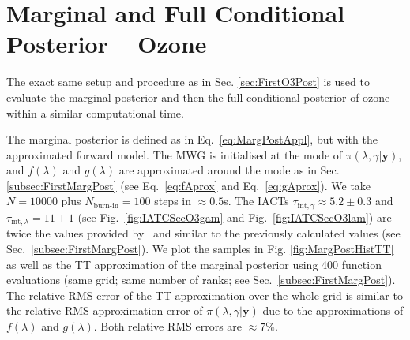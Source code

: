 \section{Marginal and Full Conditional Posterior -- Ozone}
The exact same setup and procedure as in Sec. \ref{sec:FirstO3Post} is used to evaluate the marginal posterior and then the full conditional posterior of ozone within a similar computational time.


The marginal posterior is defined as in Eq.~\ref{eq:MargPostAppl}, but with the approximated forward model.
The MWG is initialised at the mode of $\pi(\lambda,\gamma| \bm{y})$, and $f(\lambda)$ and $g(\lambda)$ are approximated around the mode as in Sec. \ref{subsec:FirstMargPost} (see Eq.~\ref{eq:fAprox} and Eq.~\ref{eq:gAprox}).
We take $N = 10000$ plus $N_{\text{burn-in}} = 100$ steps in $\approx 0.5$s.
The IACTs $\tau_{\text{int}, \gamma} \approx 5.2 \pm 0.3$ and $\tau_{\text{int}, \lambda} = 11 \pm 1 $ (see Fig.~\ref{fig:IATCSecO3gam} and Fig.~\ref{fig:IATCSecO3lam}) are twice the values provided by~\cite{drikHesse} and similar to the previously calculated values (see Sec.~\ref{subsec:FirstMargPost}).
We plot the samples in Fig. \ref{fig:MargPostHistTT} as well as the TT approximation of the marginal posterior using 400 function evaluations (same grid; same number of ranks; see Sec.~\ref{subsec:FirstMargPost}).
The relative RMS error of the TT approximation over the whole grid is similar to the relative RMS approximation error of $\pi(\lambda,\gamma| \bm{y})$ due to the approximations of $f(\lambda)$ and $g(\lambda)$.
Both relative RMS errors are $\approx 7\%$.
